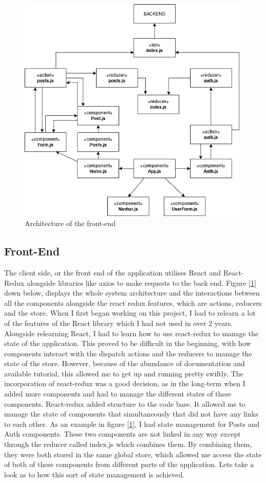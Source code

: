 \begin{figure}
    \centering
    \includegraphics[scale=0.7]{img/UML.png}
    \caption{Architecture of the front-end}
    \label{fig5:frontend}
\end{figure}

\subsection{Front-End}
The client side, or the front end of the application utilises React and React-Redux alongside libraries like axios to make requests to the back end. Figure [\ref{fig5:frontend}] down below, displays the whole system architecture and the interactions between all the components alongside the react redux features, which are actions, reducers and the store. When I first began working on this project, I had to relearn a lot of the features of the React library which I had not used in over 2 years. Alongside relearning React, I had to learn how to use react-redux to manage the state of the application. This proved to be difficult in the beginning, with how components interact with the dispatch actions and the reducers to manage the state of the store. However, because of the abundance of documentation and available tutorial, this allowed me to get up and running pretty swiftly. The incorporation of react-redux was a good decision, as in the long-term when I added more components and had to manage the different states of these components. React-redux added structure to the code base. It allowed me to manage the state of components that simultaneously that did not have any links to each other. As an example in figure [\ref{fig5:frontend}], I had state management for Posts and Auth components. These two components are not linked in any way except through the reducer called index.js which combines them. By combining them, they were both stored in the same global store, which allowed me access the state of both of these components from different parts of the application. Lets take a look as to how this sort of state management is achieved.

